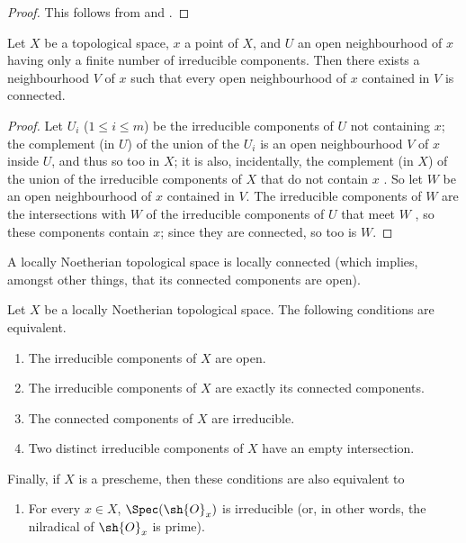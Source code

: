 \begin{proof}
This follows from  and .
\end{proof}

\begin{lemma}[6.1.8]
\label{I.6.1.8}
Let $X$ be a topological space, $x$ a point of $X$, and $U$ an open neighbourhood of $x$ having only a finite number of irreducible components.
Then there exists a neighbourhood $V$ of $x$ such that every open neighbourhood of $x$ contained in $V$ is connected.
\end{lemma}

\begin{proof}
Let $U_i$ ($1\leq i\leq m$) be the irreducible components of $U$ not containing $x$;
the complement (in $U$) of the union of the $U_i$ is an open neighbourhood $V$ of $x$ inside $U$, and thus so too in $X$;
it is also, incidentally, the complement (in $X$) of the union of the irreducible components of $X$ that do not contain $x$ .
So let $W$ be an open neighbourhood of $x$ contained in $V$.
The irreducible components of $W$ are the intersections with $W$ of the irreducible components of $U$ that meet $W$ , so these components contain $x$;
since they are connected, so too is $W$.
\end{proof}

\begin{corollary}[6.1.9]
\label{I.6.1.9}
A locally Noetherian topological space is locally connected (which implies, amongst other things, that its connected components are open).
\end{corollary}

\begin{proposition}[6.1.10]
\label{I.6.1.10}
Let $X$ be a locally Noetherian topological space.
The following conditions are equivalent.
\begin{enumerate}
  \item[{\rm(a)}] The irreducible components of $X$ are open.
  \item[{\rm(b)}] The irreducible components of $X$ are exactly its connected components.
  \item[{\rm(c)}] The connected components of $X$ are irreducible.
  \item[{\rm(d)}] Two distinct irreducible components of $X$ have an empty intersection.
\end{enumerate}
Finally, if $X$ is a prescheme, then these conditions are also equivalent to
\begin{enumerate}
  \item[{\rm(e)}] For every $x\in X$, $\Spec(\sh{O}_x)$ is irreducible (or, in other words, the nilradical of $\sh{O}_x$ is prime).
\end{enumerate}
\end{proposition}

